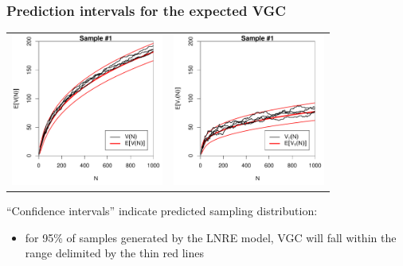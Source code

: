 \documentclass[t]{beamer} %
\begin{document}
\begin{frame}
  \frametitle{Prediction intervals for the expected VGC}

  \ungap[1]
  \begin{center}
    \begin{tabular}{c @{} c}
      \includegraphics[width=50mm]{img/05-samples-vgc-exp-vs-samples-conf} &
      \includegraphics[width=50mm]{img/05-samples-vgc-V1-exp-vs-samples-conf}
    \end{tabular}
  \end{center}

  ``Confidence intervals'' indicate predicted sampling distribution:%
  \begin{itemize}
  \item[\hand] for 95\% of samples generated by the LNRE model, VGC will fall within the range delimited by the thin red lines
  \end{itemize}

\end{frame}
\end{document}
